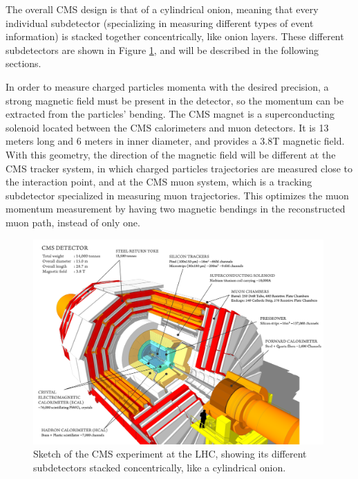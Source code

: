 The overall CMS design is that of a cylindrical onion, meaning that every individual subdetector (specializing in measuring different types of event information) is stacked together concentrically, like onion layers. 
These different subdetectors are shown in Figure \ref{fig:cms_sketch}, and will be described in the following sections. 

In order to measure charged particles momenta with the desired precision, a strong magnetic field must be present in the detector, so the momentum can be extracted from the particles' bending. 
The CMS magnet is a superconducting solenoid located between the CMS calorimeters and muon detectors. 
It is 13 meters long and 6 meters in inner diameter, and provides a 3.8T magnetic field. 
With this geometry, the direction of the magnetic field will be different at the CMS tracker system, in which charged particles trajectories are measured close to the interaction point, and at the CMS muon system, which is a tracking subdetector specialized in measuring muon trajectories. 
This optimizes the muon momentum measurement by having two magnetic bendings in the reconstructed muon path, instead of only one. 

\begin{figure}[h]
\centering 
\includegraphics[width=0.99\textwidth]{figures/cms_sketch}\hfil
\caption{Sketch of the CMS experiment at the LHC, showing its different subdetectors stacked concentrically, like a cylindrical onion. }
\label{fig:cms_sketch}
\end{figure}

